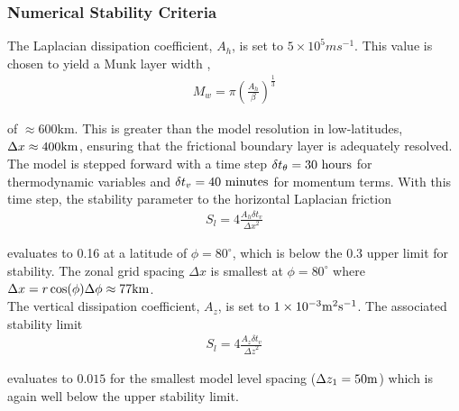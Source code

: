 {\subsubsection{Numerical Stability Criteria}

The Laplacian dissipation coefficient, $A_{h}$, is set to $5 \times 10^5 m s^{-1}$.
This value is chosen to yield a Munk layer width \cite{adcroft:95},
\begin{eqnarray}
\label{EQ:eg-hs-munk_layer}
M_{w} = \pi ( \frac { A_{h} }{ \beta } )^{\frac{1}{3}}
\end{eqnarray}

\noindent  of $\approx 600$km. This is greater than the model
resolution in low-latitudes, $\Delta x \approx 400{\rm km}$, ensuring that the frictional 
boundary layer is adequately resolved.
\\

\noindent The model is stepped forward with a 
time step $\delta t_{\theta}=30~{\rm hours}$ for thermodynamic variables and
$\delta t_{v}=40~{\rm minutes}$ for momentum terms. With this time step, the stability 
parameter to the horizontal Laplacian friction \cite{adcroft:95}
\begin{eqnarray}
\label{EQ:eg-hs-laplacian_stability}
S_{l} = 4 \frac{A_{h} \delta t_{v}}{{\Delta x}^2}
\end{eqnarray}

\noindent evaluates to 0.16 at a latitude of $\phi=80^{\circ}$, which is below the 
0.3 upper limit for stability. The zonal grid spacing $\Delta x$ is smallest at
$\phi=80^{\circ}$ where $\Delta x=r\cos(\phi)\Delta \phi\approx 77{\rm km}$.
\\

\noindent The vertical dissipation coefficient, $A_{z}$, is set to 
$1\times10^{-3} {\rm m}^2{\rm s}^{-1}$. The associated stability limit
\begin{eqnarray}
\label{EQ:eg-hs-laplacian_stability_z}
S_{l} = 4 \frac{A_{z} \delta t_{v}}{{\Delta z}^2}
\end{eqnarray}

\noindent evaluates to $0.015$ for the smallest model
level spacing ($\Delta z_{1}=50{\rm m}$) which is again well below
the upper stability limit.
\\

}
